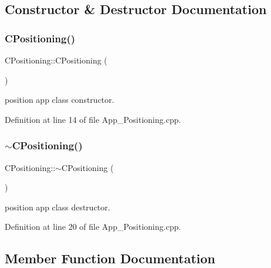 \subsection{Constructor \& Destructor Documentation}
\mbox{\label{class_c_positioning_a2ef1dd3d4755b30ac7b800876de70869}} 
\subsubsection{\texorpdfstring{C\+Positioning()}{CPositioning()}}
{\footnotesize\ttfamily C\+Positioning\+::\+C\+Positioning (\begin{DoxyParamCaption}{ }\end{DoxyParamCaption})}



position app class constructor. 



Definition at line 14 of file App\+\_\+\+Positioning.\+cpp.

\mbox{\label{class_c_positioning_a2d1846176104d85f119010a471f6483d}} 
\subsubsection{\texorpdfstring{$\sim$\+C\+Positioning()}{~CPositioning()}}
{\footnotesize\ttfamily C\+Positioning\+::$\sim$\+C\+Positioning (\begin{DoxyParamCaption}{ }\end{DoxyParamCaption})}



position app class destructor. 



Definition at line 20 of file App\+\_\+\+Positioning.\+cpp.



\subsection{Member Function Documentation}
\mbox{\label{class_c_positioning_abdceba66e701554a178acf61c61b0df6}} 
